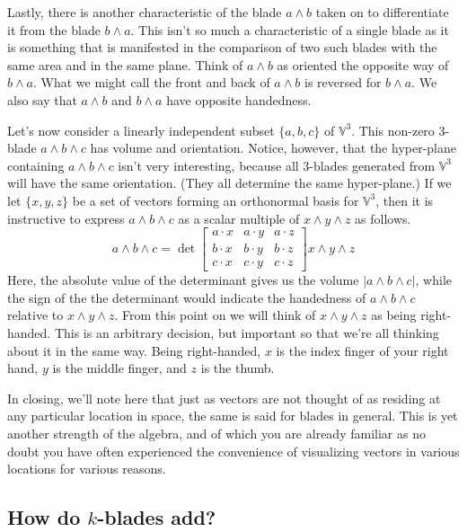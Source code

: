 \documentclass{article}
\newcommand{\V}{\mathbb{V}}
\begin{document}
Lastly, there is another characteristic of the blade $a\wedge b$ taken on to
differentiate it from the blade $b\wedge a$.  This isn't so much a characteristic
of a single blade as it is something that is manifested in the comparison of two such blades
with the same area and in the same plane.  Think of $a\wedge b$ as oriented
the opposite way of $b\wedge a$.  What we might call the front and back of $a\wedge b$
is reversed for $b\wedge a$.  We also say that $a\wedge b$ and $b\wedge a$ have opposite handedness.

Let's now consider a linearly independent subset $\{a,b,c\}$ of $\V^3$.
This non-zero 3-blade $a\wedge b\wedge c$ has volume and orientation.
Notice, however, that the hyper-plane containing $a\wedge b\wedge c$
isn't very interesting, because all 3-blades generated from $\V^3$ will have the
same orientation.  (They all determine the same hyper-plane.)  If we let
$\{x,y,z\}$ be a set of vectors forming an orthonormal
basis for $\V^3$, then it is instructive to express $a\wedge b\wedge c$ as a
scalar multiple of $x\wedge y\wedge z$ as follows.
\begin{equation}
a\wedge b\wedge c =
\det\left[\begin{array}{ccc}\label{psuedo_scalars}
a\cdot x & a\cdot y & a\cdot z \\
b\cdot x & b\cdot y & b\cdot z \\
c\cdot x & c\cdot y & c\cdot z
\end{array}\right]x\wedge y\wedge z
\end{equation}
Here, the absolute value of the determinant gives us the volume $|a\wedge b\wedge c|$,
while the sign of the the determinant would indicate the handedness of $a\wedge b\wedge c$
relative to $x\wedge y\wedge z$.  From this point on we will think of $x\wedge y\wedge z$
as being right-handed.  This is an arbitrary decision, but important so that we're all
thinking about it in the same way.  Being right-handed, $x$ is the index finger of
your right hand, $y$ is the middle finger, and $z$ is the thumb.

In closing, we'll note here that just as vectors are not thought of as residing at any
particular location in space, the same is said for blades in general.  This is yet
another strength of the algebra, and of which you are already familiar as no doubt you
have often experienced the convenience of visualizing vectors in various locations
for various reasons.

\subsection{How do $k$-blades add?}\label{add_blades_section}
\end{document}
